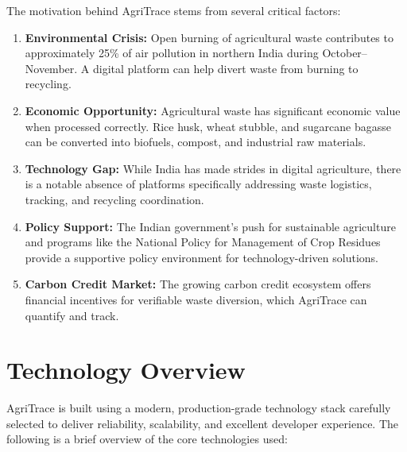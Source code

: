 \documentclass[a4paper,12pt,oneside]{report}
\let\originalitem\item
\renewcommand{\item}{\Needspace{10\baselineskip}\originalitem}
\begin{document}
\noindent The motivation behind AgriTrace stems from several critical factors:

\begin{enumerate}
    \item \textbf{Environmental Crisis:} Open burning of agricultural waste contributes to approximately 25\% of air pollution in northern India during October--November. A digital platform can help divert waste from burning to recycling.

    \item \textbf{Economic Opportunity:} Agricultural waste has significant economic value when processed correctly. Rice husk, wheat stubble, and sugarcane bagasse can be converted into biofuels, compost, and industrial raw materials.

    \item \textbf{Technology Gap:} While India has made strides in digital agriculture, there is a notable absence of platforms specifically addressing waste logistics, tracking, and recycling coordination.

    \item \textbf{Policy Support:} The Indian government's push for sustainable agriculture and programs like the National Policy for Management of Crop Residues provide a supportive policy environment for technology-driven solutions.

    \item \textbf{Carbon Credit Market:} The growing carbon credit ecosystem offers financial incentives for verifiable waste diversion, which AgriTrace can quantify and track.
\end{enumerate}

\section{Technology Overview}

\noindent AgriTrace is built using a modern, production-grade technology stack carefully selected to deliver reliability, scalability, and excellent developer experience. The following is a brief overview of the core technologies used:
\end{document}
